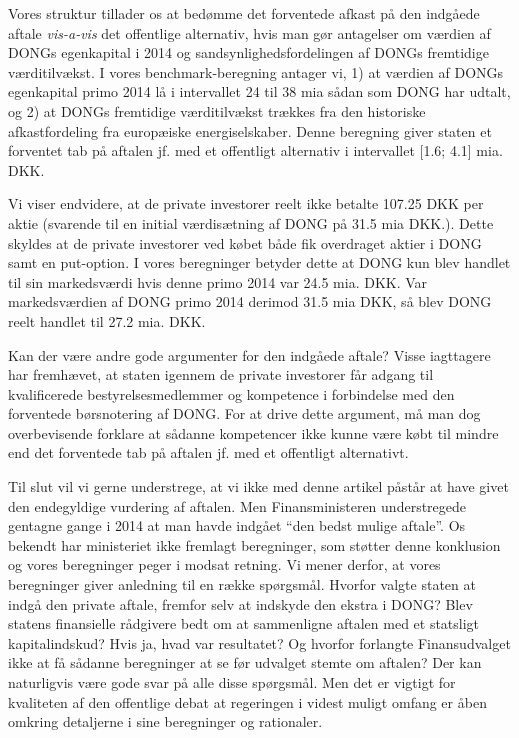 \documentclass{article}
\begin{document}
Vores struktur tillader os at bedømme det forventede afkast på den indgåede aftale \emph{vis-a-vis} det offentlige alternativ, hvis man gør antagelser om værdien af DONGs egenkapital i 2014 og sandsynlighedsfordelingen af DONGs fremtidige værditilvækst. I vores benchmark-beregning antager vi, 1) at værdien af DONGs egenkapital primo 2014 lå i intervallet 24 til 38 mia sådan som DONG har udtalt, og 2) at DONGs fremtidige værditilvækst trækkes fra den historiske afkastfordeling fra europæiske energiselskaber. Denne beregning giver staten et forventet tab på aftalen jf. med et offentligt alternativ i intervallet [1.6; 4.1] mia. DKK. 

Vi viser endvidere, at de private investorer reelt ikke betalte 107.25 DKK per aktie (svarende til en initial værdisætning af DONG på 31.5 mia DKK.). Dette skyldes at de private investorer ved købet både fik overdraget  aktier i DONG samt en put-option. I vores beregninger betyder dette at DONG kun blev handlet til sin markedsværdi hvis denne primo 2014 var 24.5 mia. DKK. Var markedsværdien af DONG primo 2014 derimod 31.5 mia DKK, så blev DONG reelt handlet til 27.2 mia. DKK. 


Kan der være andre gode argumenter for den indgåede aftale? Visse iagttagere har fremhævet, at staten igennem de private investorer får adgang til kvalificerede bestyrelsesmedlemmer og kompetence i forbindelse med den forventede børsnotering af DONG. For at drive dette argument, må man dog overbevisende forklare at sådanne kompetencer ikke kunne være købt til mindre end  det forventede tab på aftalen jf. med et offentligt alternativt. %

Til slut vil vi gerne understrege, at vi ikke med denne artikel påstår at have givet den endegyldige vurdering af aftalen. Men Finansministeren understregede gentagne gange i 2014 at man havde indgået \enquote{den bedst mulige aftale}. 
Os bekendt har ministeriet ikke fremlagt beregninger, som støtter denne konklusion og vores beregninger peger i modsat retning. Vi mener derfor, at vores beregninger giver anledning til en række spørgsmål. Hvorfor valgte staten at indgå den private aftale, fremfor selv at indskyde den ekstra i DONG? Blev statens finansielle rådgivere bedt om at sammenligne aftalen med et statsligt kapitalindskud? Hvis ja, hvad var resultatet? Og hvorfor forlangte Finansudvalget ikke at få  sådanne beregninger at se før udvalget stemte om aftalen? Der kan naturligvis være gode svar på alle disse spørgsmål. Men det er vigtigt for kvaliteten af den offentlige debat at regeringen i videst muligt omfang er åben omkring detaljerne i sine beregninger og rationaler.
\end{document}

